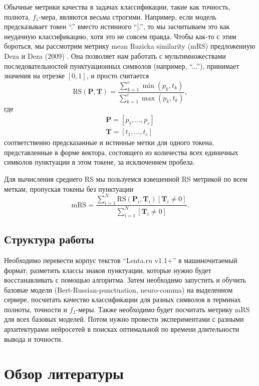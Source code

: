 \documentclass[a4paper,14pt]{extarticle}
\begin{document}
Обычные метрики качества в задачах классификации, такие как точность, полнота, $f_{1}$-мера, являются весьма строгими.
Например, если модель предсказывает токен \enquote{.} вместо истинного \enquote{].}, то мы засчитываем это как неудачную классификацию, хотя это не совсем правда.
Чтобы как-то с этим бороться, мы рассмотрим метрику mean Ruzicka similarity (mRS) предложенную Deza и Deza (2009) \cite{deza_encyclopedia_2009}.
Она позволяет нам работать с мультимножествами последовательностей пунктуационных символов (например, \enquote{...}), принимает значения на отрезке $[0, 1]$, и просто считается
\[
	\mathrm{RS}(\mathbf{P}, \mathbf{T}) = \frac{\sum\limits_{k = 1}^{c} \min\left(p_{k}, t_{k}\right)}{\sum\limits_{k = 1}^{c} \max\left(p_{k}, t_{k}\right)},
\]
где
\begin{gather*}
	\mathbf{P} = \left[p_{1}, \ldots, p_{c}\right] \\
	\mathbf{T} = \left[t_{1}, \ldots, t_{c}\right]
\end{gather*}
соответственно предсказанные и истинные метки для одного токена, представленные в форме вектора, состоящего из количества всех единичных символов пунктуации в этом токене, за исключением пробела.

Для вычисления среднего RS мы пользуемся взвешенной RS метрикой по всем меткам, пропуская токены без пунктуации
\[
	\mathrm{mRS} = \frac{\sum\limits_{i = 1}^{N} \mathrm{RS}(\mathbf{P}_{i}, \mathbf{T}_{i})[\mathbf{T}_{i} \neq 0]}{\sum\limits_{i = 1}^{N} [\mathbf{T}_{i} \neq 0]}.
\]

\subsection{Структура работы}

Необходимо перевести корпус текстов \enquote{Lenta.ru v1.1+} в машиночитаемый формат, разметить классы знаков пунктуации, которые нужно будет восстанавливать с помощью алгоритма.
Затем необходимо запустить и обучить базовые модели (Bert-Russian-punctuation, neuro-comma) на выделенном сервере, посчитать качество классификации для разных символов в терминах полноты, точности и $f_{1}$-меры.
Также необходимо будет посчитать метрику mRS для всех базовых моделей.
Потом нужно провести экспериментами с разными архитектурами нейросетей в поисках оптимальной по времени длительности вывода и точности.

\section{Обзор литературы}
\end{document}
